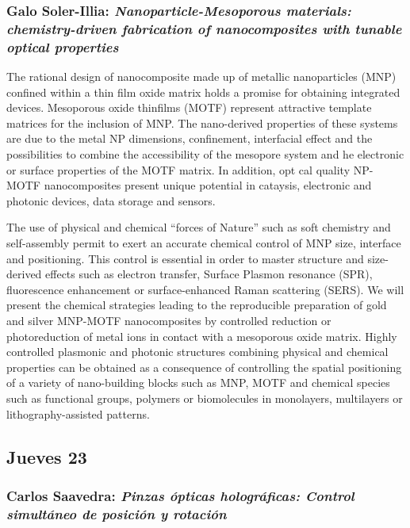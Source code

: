 \subsubsection*{Galo Soler-Illia: \textit{Nanoparticle-Mesoporous materials:
chemistry-driven fabrication of nanocomposites with tunable optical properties}}

The rational design of nanocomposite made up of metallic nanoparticles
(MNP) confined within a thin film oxide matrix holds a promise for obtaining
integrated devices. Mesoporous oxide thinfilms (MOTF) represent attractive
template matrices for the inclusion of MNP. The nano-derived properties of these
systems are due to the metal NP dimensions, confinement, interfacial effect
 and the possibilities to combine the accessibility of the mesopore system and 
he electronic or surface properties of the MOTF matrix. In addition,  opt
cal quality NP-MOTF nanocomposites present unique potential in cataysis,
electronic and photonic devices, data storage and sensors.              

The use of physical and chemical ``forces of Nature'' such as soft chemistry and
self-assembly permit to exert an accurate chemical control of MNP size,
interface and positioning. This control is essential in order to master
structure and size-derived effects such as electron transfer, Surface Plasmon
resonance (SPR), fluorescence enhancement or surface-enhanced Raman
scattering (SERS). We will present the chemical strategies leading to the
reproducible preparation of gold and silver MNP-MOTF nanocomposites by
controlled reduction or photoreduction of metal ions in contact with a
mesoporous oxide matrix. Highly controlled plasmonic and photonic structures
combining physical and chemical properties can be obtained as a consequence of
controlling the spatial positioning of a variety of nano-building blocks such as
MNP, MOTF and chemical species such as functional groups, polymers or
biomolecules in monolayers, multilayers or lithography-assisted patterns.

\subsection*{Jueves 23}

\subsubsection*{Carlos Saavedra: \textit{Pinzas \'opticas hologr\'aficas:
Control simult\'aneo de posici\'on y rotaci\'on}}

